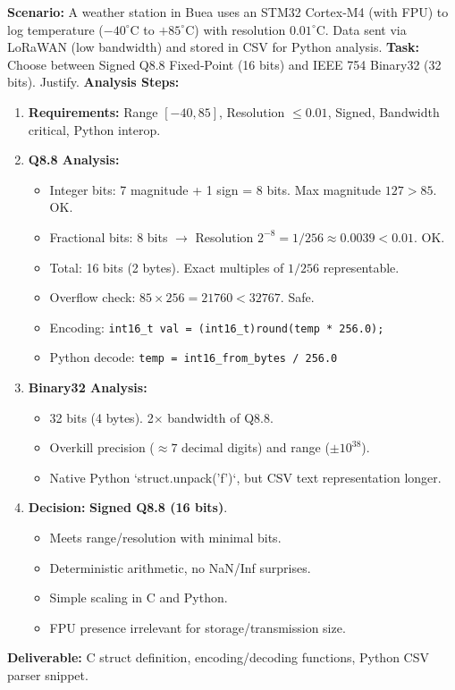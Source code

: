 \documentclass[11pt]{article}
\begin{document}
\begin{experience}
\textbf{Scenario:} A weather station in Buea uses an STM32 Cortex‑M4 (with FPU) to log temperature ($-40^\circ\text{C}$ to $+85^\circ\text{C}$) with resolution $0.01^\circ\text{C}$. Data sent via LoRaWAN (low bandwidth) and stored in CSV for Python analysis.
\textbf{Task:} Choose between Signed Q8.8 Fixed‑Point (16 bits) and IEEE 754 Binary32 (32 bits). Justify.
\textbf{Analysis Steps:}
\begin{enumerate}
    \item \textbf{Requirements:} Range $[-40, 85]$, Resolution $\le 0.01$, Signed, Bandwidth critical, Python interop.
    \item \textbf{Q8.8 Analysis:}
\begin{itemize}
            \item Integer bits: 7 magnitude + 1 sign = 8 bits. Max magnitude $127 > 85$. OK.
            \item Fractional bits: 8 bits $\to$ Resolution $2^{-8} = 1/256 \approx 0.0039 < 0.01$. OK.
            \item Total: 16 bits (2 bytes). Exact multiples of $1/256$ representable.
            \item Overflow check: $85 \times 256 = 21760 < 32767$. Safe.
            \item Encoding: \texttt{int16\_t val = (int16\_t)round(temp * 256.0);}
            \item Python decode: \texttt{temp = int16\_from\_bytes / 256.0}
        \end{itemize}
    \item \textbf{Binary32 Analysis:}
        \begin{itemize}
            \item 32 bits (4 bytes). 2$\times$ bandwidth of Q8.8.
            \item Overkill precision ($\approx 7$ decimal digits) and range ($\pm 10^{38}$).
            \item Native Python `struct.unpack('f')`, but CSV text representation longer.
        \end{itemize}
    \item \textbf{Decision:} \textbf{Signed Q8.8 (16 bits)}.
        \begin{itemize}
            \item Meets range/resolution with minimal bits.
            \item Deterministic arithmetic, no NaN/Inf surprises.
            \item Simple scaling in C and Python.
            \item FPU presence irrelevant for storage/transmission size.
        \end{itemize}
\end{enumerate}
\textbf{Deliverable:} C struct definition, encoding/decoding functions, Python CSV parser snippet.
\end{experience}
\end{document}
